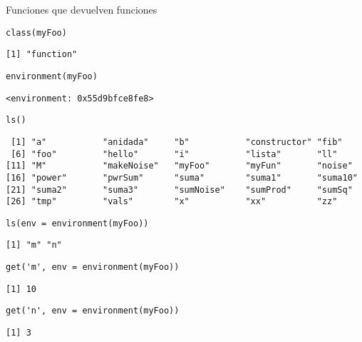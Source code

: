 \documentclass[xcolor={usenames,svgnames,dvipsnames}]{beamer}
\begin{document}
\begin{frame}[label={sec:orgbcb9eda},fragile]{Funciones que devuelven funciones}
 \lstset{language=r,label= ,caption= ,captionpos=b,numbers=none}
\begin{lstlisting}
class(myFoo)
\end{lstlisting}

\begin{verbatim}
[1] "function"
\end{verbatim}


\lstset{language=r,label= ,caption= ,captionpos=b,numbers=none}
\begin{lstlisting}
environment(myFoo)
\end{lstlisting}

\begin{verbatim}
<environment: 0x55d9bfce8fe8>
\end{verbatim}


\lstset{language=r,label= ,caption= ,captionpos=b,numbers=none}
\begin{lstlisting}
ls()
\end{lstlisting}

\begin{verbatim}
 [1] "a"           "anidada"     "b"           "constructor" "fib"        
 [6] "foo"         "hello"       "i"           "lista"       "ll"         
[11] "M"           "makeNoise"   "myFoo"       "myFun"       "noise"      
[16] "power"       "pwrSum"      "suma"        "suma1"       "suma10"     
[21] "suma2"       "suma3"       "sumNoise"    "sumProd"     "sumSq"      
[26] "tmp"         "vals"        "x"           "xx"          "zz"
\end{verbatim}


\lstset{language=r,label= ,caption= ,captionpos=b,numbers=none}
\begin{lstlisting}
ls(env = environment(myFoo))
\end{lstlisting}

\begin{verbatim}
[1] "m" "n"
\end{verbatim}


\lstset{language=r,label= ,caption= ,captionpos=b,numbers=none}
\begin{lstlisting}
get('m', env = environment(myFoo))
\end{lstlisting}

\begin{verbatim}
[1] 10
\end{verbatim}


\lstset{language=r,label= ,caption= ,captionpos=b,numbers=none}
\begin{lstlisting}
get('n', env = environment(myFoo))
\end{lstlisting}

\begin{verbatim}
[1] 3
\end{verbatim}
\end{frame}
\end{document}

